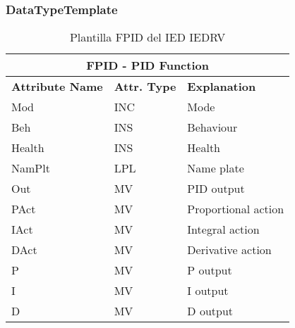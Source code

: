    \subsubsection{DataTypeTemplate}
    \begin{table}[H]
    \begin{center}
    \begin{tabular}{|l|l|p{8.5cm}|}
            \hline
            \multicolumn{3}{|c|}{\cellcolor[gray]{0.8} \textbf{ FPID}  - PID Function} \\
            \hline
            \textbf{Attribute Name} & \textbf{Attr. Type} & \textbf{Explanation} \\
            \hline 
            Mod & INC & Mode \\
            \hline
            Beh & INS & Behaviour \\
            \hline
            Health & INS & Health \\
            \hline
            NamPlt & LPL & Name plate \\
            \hline
            Out & MV & PID output \\
            \hline
            PAct & MV & Proportional action \\
            \hline
            IAct & MV & Integral action \\
            \hline
            DAct & MV & Derivative action \\
            \hline
            P & MV & P output \\
            \hline
            I & MV & I output \\
            \hline
            D & MV & D output \\
            \hline
    \end{tabular}
    \caption{Plantilla FPID del IED IEDRV}
    \label{table:lnTypeFPID_reg}
    \end{center}
    \end{table}
    
    
    